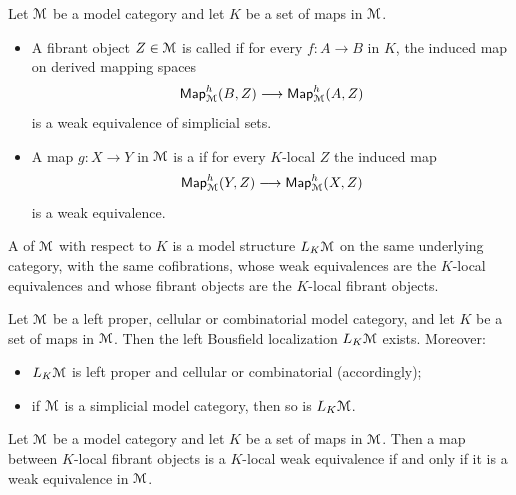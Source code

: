 \begin{definition}
  Let $\mathcal M$ be a model category and let $K$ be a set of maps in $\mathcal M$.
  \begin{itemize}
    \item A fibrant object $Z \in \mathcal M$ is called  if for every
      $f \colon A \to B$ in $K$, the induced map on derived mapping spaces
      \begin{equation}
        \operatorname{{\sf Map}}^{h}_{\mathcal M}(B,Z) \longrightarrow \operatorname{{\sf Map}}^{h}_{\mathcal M}(A,Z)
      \end{equation}
      is a weak equivalence of simplicial sets.
    \item A map $g \colon X \to Y$ in $\mathcal M$ is a 
      if for every $K$-local $Z$ the induced map
      \begin{equation}
        \operatorname{{\sf Map}}^{h}_{\mathcal M}(Y,Z) \longrightarrow \operatorname{{\sf Map}}^{h}_{\mathcal M}(X,Z)
      \end{equation}
      is a weak equivalence.
  \end{itemize}
  A  of $\mathcal M$ with respect to $K$ is a model
  structure $L_K\mathcal M$ on the same underlying category, with the same
  cofibrations, whose weak equivalences are the $K$-local equivalences and
  whose fibrant objects are the $K$-local fibrant objects.
\end{definition}

\begin{theorem}
  \label{ch2:: thm: left Bousfield localization}
  Let $\mathcal M$ be a left proper, cellular or combinatorial model category, and
  let $K$ be a set of maps in $\mathcal M$.  Then the left Bousfield localization
  $L_K\mathcal M$ exists.  Moreover:
  \begin{itemize}
    \item $L_K\mathcal M$ is left proper and cellular or combinatorial (accordingly);
    \item if $\mathcal M$ is a simplicial model category, then so is $L_K\mathcal M$.
  \end{itemize}
\end{theorem}

\begin{proposition}
  Let $\mathcal M$ be a model category and let $K$ be a set of maps in $\mathcal M$.  Then
  a map between $K$-local fibrant objects is a $K$-local weak equivalence if
  and only if it is a weak equivalence in $\mathcal M$.
\end{proposition}




